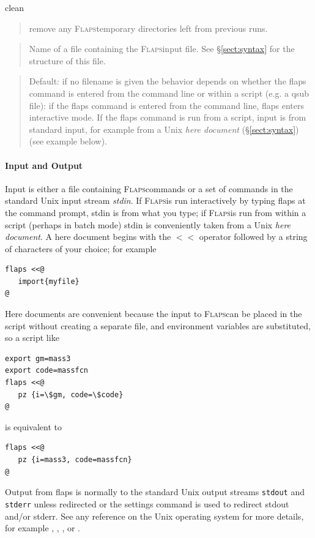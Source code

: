 \documentclass[11pt,openany,twoside]{book}
\numberwithin{equation}{section}		%
\newcommand{\Cmd}[1]{{\sf #1}}
\newcommand{\Newterm}[1]{{\em #1}}
\newcommand{\Code}[1]{{\small\tt #1}}
\newcommand{\Subst}[1]{{\small\sf #1}}
\newcommand{\Flaps}{\textsc{Flaps\:}}
\newcommand{\Spec}[1]{{\small\ttfamily #1}}
\newcommand{\Sectref}[1]{\S\ref{#1}}
\begin{document}
\par
\Spec{clean}
\begin{quote}
\par
remove any \Flaps temporary directories left from
previous runs.
\end{quote}

\par
\Spec{\Subst{filename}}
\begin{quote}
\par
Name of a file containing the \Flaps input file.
See \Sectref{sect:syntax} for
the structure of this file.
\end{quote}

\begin{quote}
Default: if no \Subst{filename}
is given the behavior depends on whether the \Cmd{flaps} command is entered
from the command line or within a script (e.g. a qsub file):
if the \Cmd{flaps} command
is entered from the command line, \Cmd{flaps} enters interactive mode.
If the \Cmd{flaps} command is run from a script, input is from standard input,
for example from a Unix
\Newterm{here document}
(\Sectref{sect:syntax}) (see example below).
\end{quote}
\par


\paragraph{Input and Output}
Input is either a file containing \Flaps commands or a set
of commands in the standard Unix input stream \Newterm{stdin}.
If \Flaps is run interactively by typing \Cmd{flaps} at
the command prompt, stdin is from what you type; if \Flaps is
run from within a script (perhaps in batch mode) stdin is
conveniently taken from a Unix \Newterm{here document}.
A here document begins with the
{\sffamily $<$$<$} operator followed by a string of characters of your choice; for
example
\begin{lstlisting}
flaps <<@
   import{myfile}
@
\end{lstlisting}

Here documents are convenient because the input to \Flaps can
be placed in the script without creating a separate file,
and environment variables are substituted, so a script like
\begin{lstlisting}
export gm=mass3
export code=massfcn
flaps <<@
   pz {i=\$gm, code=\$code}
@
\end{lstlisting}
is equivalent to
\begin{lstlisting}
flaps <<@
   pz {i=mass3, code=massfcn}
@
\end{lstlisting}
\par
Output from \Cmd{flaps} is normally to the standard Unix
output streams \Code{stdout} and \Code{stderr} unless redirected
or the \Cmd{settings} command is used to redirect stdout and/or
stderr. See any reference on the Unix operating system for more
details, for example \cite{gilly1992unix}, \cite{abrahams1992unix},
\cite{kernighan1984unix}, or \cite{rosenblatt1993learning}.
\end{document}
